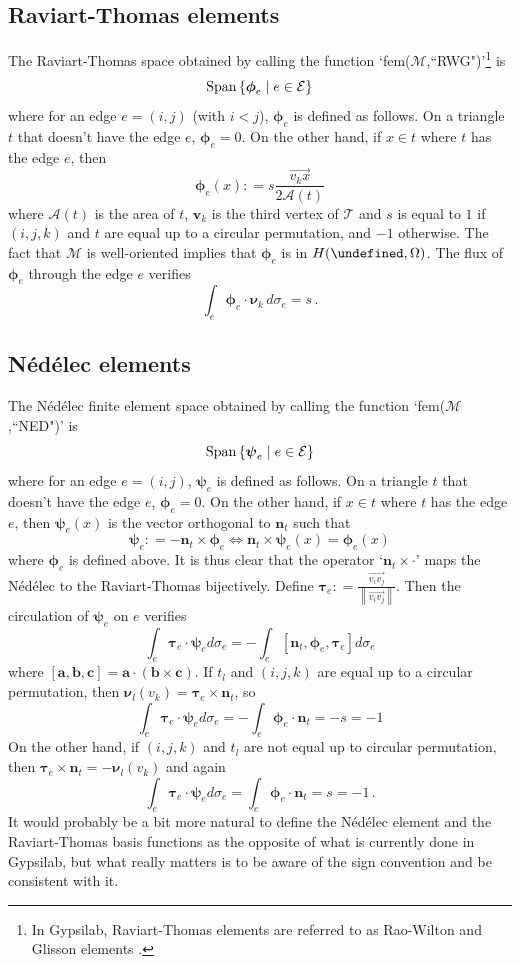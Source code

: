 \documentclass[]{article}
\theoremstyle{definition}
\theoremstyle{remark}
\newcommand{\enstq}[2]{\left\{#1\mathrel{}\middle|\mathrel{}#2\right\}}
\newcommand{\norm}[1]{\left\|#1\right\|}
\newcommand{\isdef}{\mathrel{\mathop:}=}
\let\div\undefined
\DeclareMathOperator{\div}{\textup{div}}
\renewcommand*{\vec}[1]{\boldsymbol{#1}}
\begin{document}
\subsection*{Raviart-Thomas elements}

The Raviart-Thomas space obtained by calling the function `fem($\mathcal{M}$,``RWG")'\footnote{In Gypsilab, Raviart-Thomas elements are referred to as Rao-Wilton and Glisson elements \cite{rao}.} is
\[\textup{Span}\enstq{\vec{\phi}_e}{e \in \mathcal{E}}\]
where for an edge $e = (i,j)$ (with $i < j$), $\vec \phi_e$ is defined as follows. On a triangle $t$ that doesn't have the edge $e$, $\vec \phi_e = 0$. On the other hand, if $x \in t$ where $t$ has the edge $e$, then
\[\vec \phi_e(x) \isdef s\frac{\overrightarrow{v_k x}}{2\mathcal{A}(t)}\]
where $\mathcal{A}(t)$ is the area of $t$, $\vec v_k$ is the third vertex of $\mathcal{T}$ and $s$ is equal to $1$ if $(i,j,k)$ and $t$ are equal up to a circular permutation, and $-1$ otherwise.
The fact that $\mathcal{M}$ is well-oriented implies that $\vec\phi_e$ is in $H(\div,\Omega)$. The flux of $\vec \phi_e$ through the edge $e$ verifies
\[\int_{e} \vec \phi_e \cdot \vec \nu_k \,d\sigma_e = s\,.\]

\subsection*{Nédélec elements}

The Nédélec finite element space obtained by calling the function `fem($\mathcal{M}$,``NED")' is 
\[\textup{Span}\enstq{\vec{\psi}_e}{e \in \mathcal{E}}\]
where for an edge $e = (i,j)$, $\vec \psi_e$ is defined as follows. On a triangle $t$ that doesn't have the edge $e$, $\vec \phi_e = 0$. On the other hand, if $x \in t$ where $t$ has the edge $e$, then $\vec \psi_e(x)$ is the vector orthogonal to $\vec n_t$ such that
\[ \vec \psi_e \isdef -\vec n_t \times \vec\phi_e \iff \vec n_t \times \vec \psi_e(x) = \vec \phi_e(x)\]
where $\vec \phi_e$ is defined above. It is thus clear that the operator `$\vec n_t \times \cdot$' maps the Nédélec to the Raviart-Thomas bijectively. Define $\vec \tau_e \isdef \frac{\overrightarrow{v_iv_j}}{\norm{\overrightarrow{v_iv_j}}}$. Then the circulation of $\vec \psi_e$ on $e$ verifies
\[\int_{e} \vec \tau_e \cdot \vec \psi_e d\sigma_e= - \int_{e} [\vec n_t, \vec \phi_e,\vec \tau_e]d\sigma_e \]
where $[\vec a,\vec b,\vec c] = \vec a \cdot (\vec b \times \vec c)$. If $t_l$ and $(i,j,k)$ are equal up to a circular permutation, then $\vec \nu_l(v_k) = \vec \tau_e \times \vec n_t$, so  
\[\int_{e} \vec \tau_e \cdot \vec \psi_e d\sigma_e = -\int_e \vec \phi_e \cdot \vec n_t = -s = -1\]
On the other hand, if $(i,j,k)$ and $t_l$ are not equal up to circular permutation, then $\vec \tau_e \times \vec n_t = -\vec \nu_l(v_k)$ and again
\[\int_{e} \vec \tau_e \cdot \vec \psi_e d\sigma_e = \int_e \vec \phi_e \cdot \vec n_t = s = -1\,.\]
It would probably be a bit more natural to define the Nédélec element and the Raviart-Thomas basis functions as the opposite of what is currently done in Gypsilab, but what really matters is to be aware of the sign convention and be consistent with it. 
\end{document}
